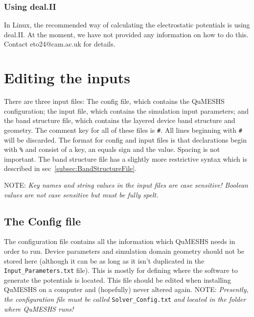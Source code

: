 \documentclass[12pt]{article}
\begin{document}
\subsubsection{Using deal.II}
\label{subsubsec:UsingdealII}

In Linux, the recommended way of calculating the electrostatic potentials is using deal.II.  At the moment, we have not provided any information on how to do this.  Contact eto24@cam.ac.uk for details.

\section{Editing the inputs}
\label{sec:Inputs}

There are three input files: The config file, which contains the QuMESHS configuration;
the input file, which contains the simulation input parameters; and the band structure
file, which contains the layered device band structure and geometry.  The comment key
for all of these files is \texttt{\#}.  All lines beginning with \texttt{\#} will be
discarded.  The format for config and input files is that declarations begin with
\texttt{\%} and consist of a key, an equals sign and the value.  Spacing is not important.
The band structure file has a slightly more restrictive syntax which is described in
sec~\ref{subsec:BandStructureFile}.

{\color{red} NOTE:} \emph{Key names and string values in the input files are case
sensitive!  Boolean values are not case sensitive but must be fully spelt.}

\subsection{The Config file}
\label{subsec:ConfigFile}

The configuration file contains all the information which QuMESHS needs in order
to run.  Device parameters and simulation domain geometry should not be stored here
(although it can be as long as it isn't duplicated in the \texttt{Input\_Parameters.txt}
file).  This is mostly for defining where the software to generate the potentials is
located.  This file should be edited when installing QuMESHS on a computer and
(hopefully) never altered again.  {\color{red} NOTE:} \emph{Presently, the
configuration file must be called} \texttt{Solver\_Config.txt} \emph{and located in
the folder where QuMESHS runs!}
\end{document}
